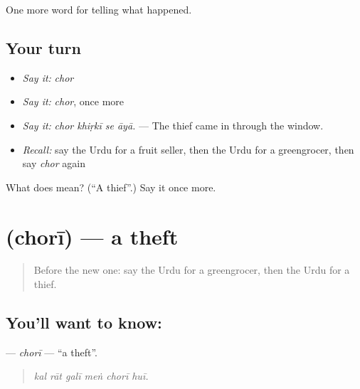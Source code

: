 \begin{grammarlens}[title={What you've built}]
One more word for telling what happened.
\end{grammarlens}

\subsection*{Your turn}
\begin{itemize}
\raggedright
  \item \emph{Say it:} \emph{chor}
  \item \emph{Say it:} \emph{chor}, once more
  \item \emph{Say it:} \emph{chor khiṛkī se āyā.} — The thief came in through the window.
  \item \emph{Recall:} say the Urdu for a fruit seller, then the Urdu for a greengrocer, then say \emph{chor} again
\end{itemize}

\begin{tcolorbox}[breakable,colback=teal!4,colframe=teal!35!black,title={Before you move on}]
What does  mean? (\textquotedblleft{}A thief\textquotedblright{}.) Say it once more.
\end{tcolorbox}
\section[\texorpdfstring{\ur{چوری} (chorī)}{چوری (chorī)}]{ (chorī) — a theft}

\label{lesson:UR-C276-chori}



\begin{quote}
Before the new one: say the Urdu for a greengrocer, then the Urdu for a thief.
\end{quote}

\subsection*{You'll want to know: }
\textbf{} — \emph{chorī} — \textquotedblleft{}a theft\textquotedblright{}.

\begin{quote}
     
\end{quote}

\begin{quote}
\emph{kal rāt galī meṅ chorī huī.}
\end{quote}

